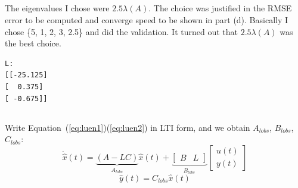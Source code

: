\documentclass[12pt]{article}
\begin{document}
\subsection{}
The eigenvalues I chose were $2.5\lambda(A)$. The choice was justified in the RMSE error to be computed and converge speed to be shown in part (d). Basically I chose \{5, 1, 2, 3, 2.5\} and did the validation. It turned out that $2.5\lambda(A)$ was the best choice.

\begin{Verbatim}
L:
[[-25.125]
[  0.375]
[ -0.675]]
\end{Verbatim}
\subsection{}
Write Equation~(\ref{eq:luen1})(\ref{eq:luen2}) in LTI form, and we obtain $A_{lobs}$, $B_{lobs}$, $C_{lobs}$:
\begin{equation}
\dot{\hat x}(t)=\underbrace{(A-LC)}_{A_{lobs}}\hat x(t)+\underbrace{\left[
\begin{array}{cc}
B&L
\end{array}
\right]}_{B_{lobs}}\left[
\begin{array}{c}
u(t)\\
y(t)
\end{array}
\right]
\end{equation}
\begin{equation}
\hat y(t)=C_{lobs}\hat x(t)
\end{equation}
\end{document}
